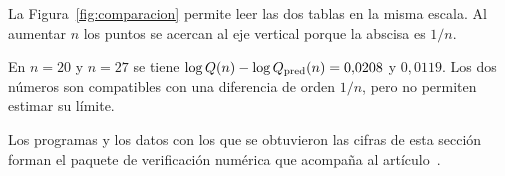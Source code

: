 La Figura~\ref{fig:comparacion} permite leer las dos tablas en la misma escala.
Al aumentar $n$ los puntos se acercan al eje vertical porque la abscisa es $1/n$.



En $n=20$ y $n=27$ se tiene $\log Q(n)-\log Q_{\rm pred}(n)=0{,}0208$ y $0{,}0119$. Los dos números
son compatibles con una diferencia de orden $1/n$, pero no permiten estimar su límite.

Los programas y los datos con los que se obtuvieron las cifras de esta sección forman el paquete de
verificación numérica que acompaña al artículo~\cite{Codigo}.
